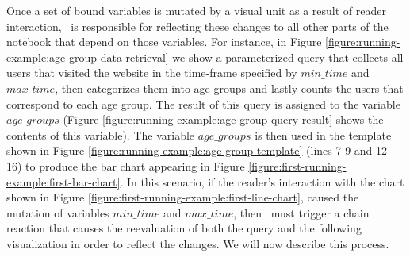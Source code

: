 Once a set of bound variables is mutated by a visual unit as a result of reader interaction, \projname\ is responsible for reflecting these changes to all other parts of the notebook that depend on those variables. For instance, in Figure \ref{figure:running-example:age-group-data-retrieval} we show a parameterized query that collects all users that visited the website in the time-frame specified by $min\_time$ and $max\_time$, then categorizes them into age groups and lastly counts the users that correspond to each age group. The result of this query is assigned to the variable $age\_groups$ (Figure \ref{figure:running-example:age-group-query-result} shows the contents of this variable). The variable $age\_groups$ is then used in the template shown in Figure \ref{figure:running-example:age-group-template} (lines 7-9 and 12-16) to produce the bar chart appearing in Figure \ref{figure:first-running-example:first-bar-chart}. In this scenario, if the reader's interaction with the chart shown in Figure \ref{figure:first-running-example:first-line-chart}, caused the mutation of variables $min\_time$ and $max\_time$, then \projname\ must trigger a chain reaction that causes the reevaluation of both the query and the following visualization in order to reflect the changes. We will now describe this process.








